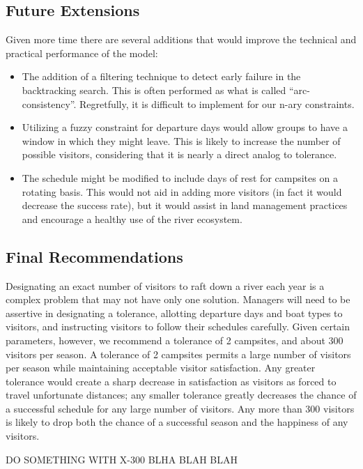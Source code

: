 \documentclass[11pt]{article} %
\begin{document}
\subsection{Future Extensions}
\label{sec:extensions}
Given more time there are several additions that would improve the technical
and practical performance of the model:
\begin{itemize}
\item The addition of a filtering technique to detect early failure in the
backtracking search.  This is often performed as what is called
``arc-consistency''.  Regretfully, it is difficult to implement for our
n-ary constraints.
\item Utilizing a fuzzy constraint for departure days would allow groups
to have a window in which they might leave.  This is likely to increase the
number of possible visitors, considering that it is nearly a direct analog
to tolerance.
\item The schedule might be modified to include days of rest for campsites
on a rotating basis.  This would not aid in adding more visitors (in fact it
would decrease the success rate), but it would assist in land management
practices and encourage a healthy use of the river ecosystem.
\end{itemize}


\subsection{Final Recommendations}
\label{sec:final}
Designating an exact number of visitors to raft down a river each year is
a complex problem that may not have only one solution. Managers will need
to be assertive in designating a tolerance, allotting departure days and
boat types to visitors, and instructing visitors to follow their schedules
carefully. Given certain parameters, however, we recommend a tolerance of
2 campsites, and about 300 visitors per season. A tolerance of 2 campsites
permits a large number of visitors per season while maintaining acceptable
visitor satisfaction. Any greater tolerance would create a sharp decrease
in satisfaction as visitors as forced to travel unfortunate distances; any
smaller tolerance greatly decreases the chance of a successful schedule for
any large number of visitors. Any more than 300 visitors is likely to drop
both the chance of a successful season and the happiness of any visitors.

DO SOMETHING WITH X-300 BLHA BLAH BLAH


\newpage




\end{document}
